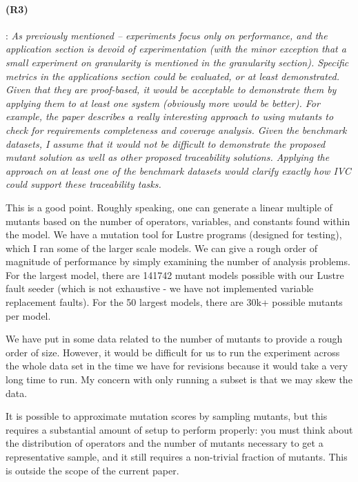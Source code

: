 \documentclass{article}
\begin{document}
\paragraph{(R3)}: \textit{As previously mentioned -- experiments focus only on performance, and the application section is devoid of experimentation (with the minor exception that a small experiment on granularity is mentioned in the granularity section). Specific metrics in the applications section could be evaluated, or at least demonstrated. Given that they are proof-based, it would be acceptable to demonstrate them by applying them to at least one system (obviously more would be better). For example, the paper describes a really interesting approach to using mutants to check for requirements completeness and coverage analysis. Given the benchmark datasets, I assume that it would not be difficult to demonstrate the proposed mutant solution as well as other proposed traceability solutions. Applying the approach on at least one of the benchmark datasets would clarify exactly how IVC could support these traceability tasks.}
\vspace{0.05in}

This is a good point.  Roughly speaking, one can generate a linear multiple of mutants based on the number of operators, variables, and constants found within the model.  We have a mutation tool for Lustre programs (designed for testing), which I ran some of the larger scale models.  We can give a rough order of magnitude of performance by simply examining the number of analysis problems.  For the largest model, there are 141742 mutant models possible with our Lustre fault seeder (which is not exhaustive - we have not implemented variable replacement faults).   For the 50 largest models, there are 30k+ possible mutants per model.

We have put in some data related to the number of mutants to provide a rough order of size.  However, it would be difficult for us to run the experiment across the whole data set in the time we have for revisions because it would take a very long time to run.  My concern with only running a subset is that we may skew the data.

It is possible to approximate mutation scores by sampling mutants, but this requires a substantial amount of setup to perform properly: you must think about the distribution of operators and the number of mutants necessary to get a representative sample, and it still requires a non-trivial fraction of mutants.  This is outside the scope of the current paper.
\end{document}
